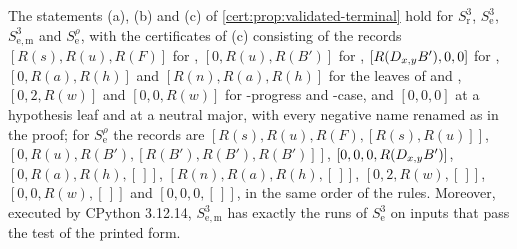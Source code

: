 \begin{theorem}\label{cert:thm:floor-phase}
The statements (a), (b) and (c) of \cref{cert:prop:validated-terminal} hold for
$S^{3}_{\mathrm r}$, $S^{3}_{\mathrm e}$, $S^{3}_{\mathrm{e,m}}$ and
$S^{\rho}_{\mathrm e}$, with the certificates of (c) consisting of the records
$[R(s),R(u),R(F)]$ for , $[0,R(u),R(B')]$ for ,
$[R(D_{x,y}B'),0,0]$ for , $[0,R(a),R(h)]$ and $[R(n),R(a),R(h)]$ for the
leaves of  and , $[0,2,R(w)]$ and $[0,0,R(w)]$ for
-progress and -case, and $[0,0,0]$ at a hypothesis leaf and
at a neutral major, with every negative name renamed as in the proof; for
$S^{\rho}_{\mathrm e}$ the records are $[R(s),R(u),R(F),[R(s),R(u)]]$,
$[0,R(u),R(B'),[R(B'),R(B'),R(B')]]$, $[0,0,0,R(D_{x,y}B')]$,
$[0,R(a),R(h),[\,]]$, $[R(n),R(a),R(h),[\,]]$, $[0,2,R(w),[\,]]$, $[0,0,R(w),[\,]]$
and $[0,0,0,[\,]]$, in the same order of the rules.
Moreover, executed by CPython 3.12.14, $S^{3}_{\mathrm{e,m}}$ has exactly the runs of
$S^{3}_{\mathrm e}$ on inputs that pass the test of the printed form.
\end{theorem}
